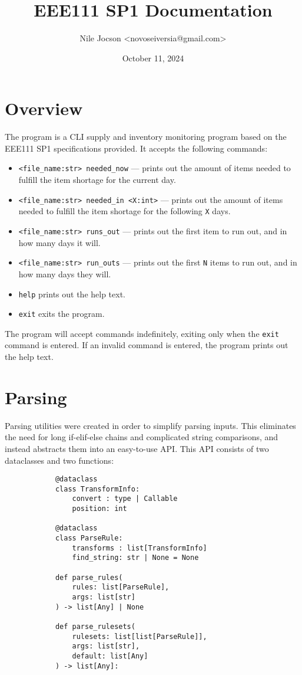 \documentclass{article}
\title{EEE111 SP1 Documentation}
\author{Nile Jocson \textless{novoseiversia@gmail.com}\textgreater}
\date{October 11, 2024}
\begin{document}
	\maketitle
		\pagebreak



	\tableofcontents
		\pagebreak



	\section{Overview}
		The program is a CLI supply and inventory monitoring program based on
		the EEE111 SP1 specifications provided. It accepts the following commands:

		\begin{itemize}
			\item \verb|<file_name:str> needed_now| --- prints out the amount of items
			needed to fulfill the item shortage for the current day.
			\item \verb|<file_name:str> needed_in <X:int>| --- prints out the amount of items
			needed to fulfill the item shortage for the following \verb|X| days.
			\item \verb|<file_name:str> runs_out| --- prints out the first item to run out, and
			in how many days it will.
			\item \verb|<file_name:str> run_outs| --- prints out the first \verb|N| items to run
			out, and in how many days they will.
			\item \verb|help| prints out the help text.
			\item \verb|exit| exits the program.
		\end{itemize}

		The program will accept commands indefinitely, exiting only when the \verb|exit| command is
		entered. If an invalid command is entered, the program prints out the help text.

		\pagebreak

	\section{Parsing}
		Parsing utilities were created in order to simplify parsing inputs. This eliminates the
		need for long if-elif-else chains and complicated string comparisons, and instead
		abstracts them into an easy-to-use API\@. This API consists of two dataclasses and
		two functions:

		\begin{verbatim}
			@dataclass
			class TransformInfo:
				convert : type | Callable
				position: int

			@dataclass
			class ParseRule:
				transforms : list[TransformInfo]
				find_string: str | None = None

			def parse_rules(
				rules: list[ParseRule],
				args: list[str]
			) -> list[Any] | None

			def parse_rulesets(
				rulesets: list[list[ParseRule]],
				args: list[str],
				default: list[Any]
			) -> list[Any]:
		\end{verbatim}
\end{document}
